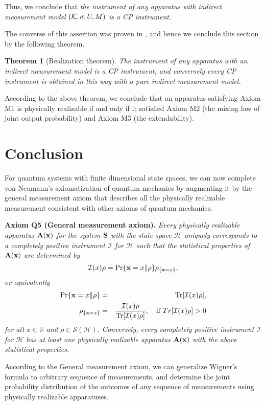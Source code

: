\documentclass[12pt]{article}
\newcommand{\beq}{\begin{equation}}
\newcommand{\eeq}{\end{equation}}
\newcommand{\beqa}{\begin{eqnarray}}
\newcommand{\eeqa}{\end{eqnarray}}
\newcommand{\bA}{{\bf A}}
\newcommand{\bS}{{\bf S}}
\newcommand{\cH}{{\mathcal H}}
\newcommand{\cI}{{\mathcal I}}
\newcommand{\cS}{{\mathcal S}}
\newcommand{\mb}{\mbox}
\newcommand{\rh}{\rho}
\newcommand{\Tr}{\mbox{\rm Tr}}
\newcommand{\bx}{{\bf x}}
\newtheorem{Theorem}{Theorem}
\newcommand{\R}{\mathbb{R}}
\begin{document}
Thus, we conclude that 
{\em the instrument of any apparatus
with indirect measurement  model
$({\cal K},\sigma,U,M)$ is a CP instrument}.  

The converse of this assertion was proven in \cite{84QC},
and hence we conclude this section by the following theorem.

\begin{Theorem}[Realization theorem]
\label{th:realization}
The instrument of any apparatus
with an indirect measurement model
is a CP instrument,
and conversely every CP instrument is obtained in this
way with a pure indirect measurement model.
\end{Theorem}

According to the above theorem, we conclude that an apparatus satisfying Axiom M1
is physically realizable if and only if it satisfied Axiom M2 (the mixing law of joint output 
probability) and Axiom M3 (the extendability). 


\section{Conclusion}
 For quantum systems with finite dimensional state spaces,
we can now complete von Neumann's axiomatization of quantum 
mechanics by augmenting it by the general measurement axiom that describes 
all the physically realizable measurement consistent with other axioms
of quantum mechanics.
\bigskip

{\bf Axiom Q5 (General measurement axiom).}
{\em Every physically realizable apparatus $\bA(\bx)$ for the system $\bS$ with the
state space $\cH$ uniquely corresponds to a completely positive instrument $\cI$ for $\cH$
such that the statistical properties of $\bA(\bx)$ are determined by 
\beq
\cI(x)\rh=\Pr\{\bx=x\|\rh\}\rh_{\{\bx=x\}},
\eeq
or equivalently
\beqa
\Pr\{\bx=x\|\rh\}&=&\Tr[\cI(x)\rh], \\
\rh_{\{\bx=x\}}&=&\frac{\cI(x)\rh}{\Tr[\cI(x)\rh]},\quad\mb{if $Tr[\cI(x)\rh]>0$}
\eeqa
for all $x\in\R$ and $\rh\in\cS(\cH)$.  Conversely, every completely positive instrument $\cI$ for $\cH$
has at least one physically realizable apparatus $\bA(\bx)$ with the above
statistical properties.}
\bigskip

According to the General measurement axiom, 
we can generalize Wigner's formula to arbitrary sequence of measurements,
and determine the joint probability distribution of the outcomes of
 any sequence of  measurements using physically realizable apparatuses.
\end{document}
